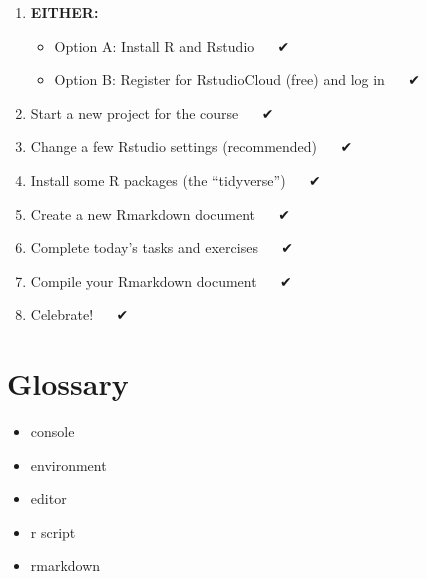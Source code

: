 \documentclass[]{book}
\providecommand{\tightlist}{%
  \setlength{\itemsep}{0pt}\setlength{\parskip}{0pt}}
\begin{document}
\begin{enumerate}
\def\labelenumi{\arabic{enumi}.}
\tightlist
\item
  \textbf{EITHER:}

  \begin{itemize}
  \tightlist
  \item
    Option A: Install R and Rstudio   ✔
  \item
    Option B: Register for RstudioCloud (free) and log in   ✔
  \end{itemize}
\item
  Start a new project for the course   ✔
\item
  Change a few Rstudio settings (recommended)   ✔
\item
  Install some R packages (the ``tidyverse'')   ✔
\item
  Create a new Rmarkdown document   ✔
\item
  Complete today's tasks and exercises   ✔
\item
  Compile your Rmarkdown document   ✔
\item
  Celebrate!   ✔ 🎉
\end{enumerate}

\hypertarget{glossary}{%
\section*{Glossary}\label{glossary}}

\begin{itemize}
\tightlist
\item
  console
\item
  environment
\item
  editor
\item
  r script
\item
  rmarkdown
\end{itemize}
\end{document}
